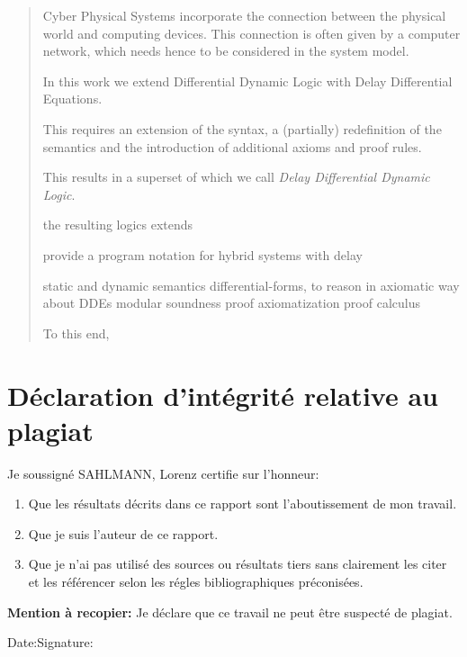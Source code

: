 \begin{abstract}
    Cyber Physical Systems incorporate the connection between the physical world and computing devices.
    This connection is often given by a computer network, which needs hence to be considered in the system model.

    In this work we extend Differential Dynamic Logic with Delay Differential Equations.

    This requires an extension of the syntax, a (partially) redefinition of the semantics and the introduction of additional axioms and proof rules.

    This results in a superset of \dL which we call \emph{Delay Differential Dynamic Logic}.

    the resulting logics extends

    provide a program notation for hybrid systems with delay

    static and dynamic semantics
    differential-forms, to reason in axiomatic way about DDEs
    modular soundness proof
    axiomatization
    proof calculus

    To this end,
\end{abstract}

\begin{otherlanguage}{frenchb}
    \chapter*{Déclaration d’intégrité relative au plagiat}

    Je soussigné SAHLMANN, Lorenz certifie sur l’honneur:
    \begin{enumerate}
        \item Que les résultats décrits dans ce rapport sont l’aboutissement de mon travail.
        \item Que je suis l’auteur de ce rapport.
        \item Que je n’ai pas utilisé des sources ou résultats tiers sans clairement les citer et les référencer selon les régles bibliographiques préconisées.
    \end{enumerate}

    \textbf{Mention à recopier:}
    Je déclare que ce travail ne peut être suspecté de plagiat.

    \vspace{2cm}
    Date:\hfil Signature:

\end{otherlanguage}

\cleardoublepage

